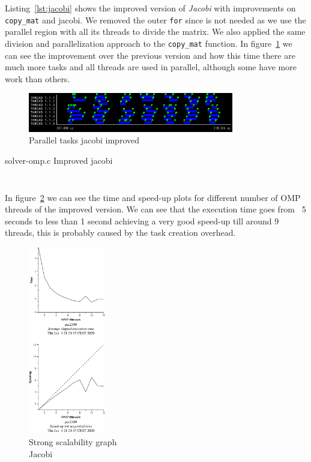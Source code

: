 Listing~\ref{lst:jacobi} shows the improved version of \emph{Jacobi} with improvements on \texttt{copy\_mat}
and jacobi. We removed the outer \texttt{for}
since is not needed as we use the parallel region with all its threads to divide the matrix. We also
applied the same division and parallelization approach to the \texttt{copy\_mat} function.
In figure~\ref{fig:trace-jacobi1} we can see the improvement over the previous version and how this time
there are much more tasks and all threads are used in parallel, although some have more work than others.

\begin{figure}[H]
    \centering
    \includegraphics[width=0.8\textwidth]{jacobi_1_tasks}
    \caption{Parallel tasks jacobi improved}%
    \label{fig:trace-jacobi1}
\end{figure}

\begin{listing}[H]
    \caption{solver-omp.c Improved jacobi}%
    \label{lst:jacobi}
    \inputminted[firstline=8,lastline=19]{c}{code/solver-omp.c}
    \vspace{-2.5em}
    \inputminted[firstline=25,lastline=52]{c}{code/solver-omp.c}
\end{listing}

In figure~\ref{fig:strong-jacobi} we can see the time and speed-up plots for different number 
of OMP threads of the improved version.
We can see that the execution time goes from ~5 seconds to less than 1 second
achieving a very good speed-up till around 9 threads, this is probably caused by the task creation
overhead.

\begin{figure}[H]
    \centering
    \includegraphics[width=0.3\textwidth]{heat-omp-strong-jacobi-crop}
    \caption{Strong scalability graph \\ Jacobi}%
    \label{fig:strong-jacobi}
\end{figure}


